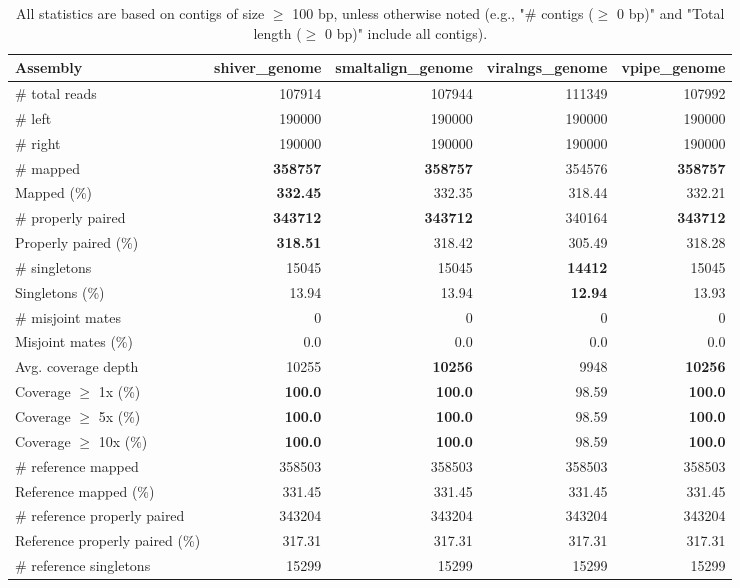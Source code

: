 \documentclass[12pt,a4paper]{article}
\begin{document}
\begin{table}[ht]
\begin{center}
\caption{All statistics are based on contigs of size $\geq$ 100 bp, unless otherwise noted (e.g., "\# contigs ($\geq$ 0 bp)" and "Total length ($\geq$ 0 bp)" include all contigs).}
\begin{tabular}{|l*{4}{|r}|}
\hline
Assembly & shiver\_genome & smaltalign\_genome & viralngs\_genome & vpipe\_genome \\ \hline
\# total reads & 107914 & 107944 & 111349 & 107992 \\ \hline
\# left & 190000 & 190000 & 190000 & 190000 \\ \hline
\# right & 190000 & 190000 & 190000 & 190000 \\ \hline
\# mapped & {\bf 358757} & {\bf 358757} & 354576 & {\bf 358757} \\ \hline
Mapped (\%) & {\bf 332.45} & 332.35 & 318.44 & 332.21 \\ \hline
\# properly paired & {\bf 343712} & {\bf 343712} & 340164 & {\bf 343712} \\ \hline
Properly paired (\%) & {\bf 318.51} & 318.42 & 305.49 & 318.28 \\ \hline
\# singletons & 15045 & 15045 & {\bf 14412} & 15045 \\ \hline
Singletons (\%) & 13.94 & 13.94 & {\bf 12.94} & 13.93 \\ \hline
\# misjoint mates & 0 & 0 & 0 & 0 \\ \hline
Misjoint mates (\%) & 0.0 & 0.0 & 0.0 & 0.0 \\ \hline
Avg. coverage depth & 10255 & {\bf 10256} & 9948 & {\bf 10256} \\ \hline
Coverage $\geq$ 1x (\%) & {\bf 100.0} & {\bf 100.0} & 98.59 & {\bf 100.0} \\ \hline
Coverage $\geq$ 5x (\%) & {\bf 100.0} & {\bf 100.0} & 98.59 & {\bf 100.0} \\ \hline
Coverage $\geq$ 10x (\%) & {\bf 100.0} & {\bf 100.0} & 98.59 & {\bf 100.0} \\ \hline
\# reference mapped & 358503 & 358503 & 358503 & 358503 \\ \hline
Reference mapped (\%) & 331.45 & 331.45 & 331.45 & 331.45 \\ \hline
\# reference properly paired & 343204 & 343204 & 343204 & 343204 \\ \hline
Reference properly paired (\%) & 317.31 & 317.31 & 317.31 & 317.31 \\ \hline
\# reference singletons & 15299 & 15299 & 15299 & 15299 \\ \hline

\end{tabular}
\end{center}
\end{table}
\end{document}
